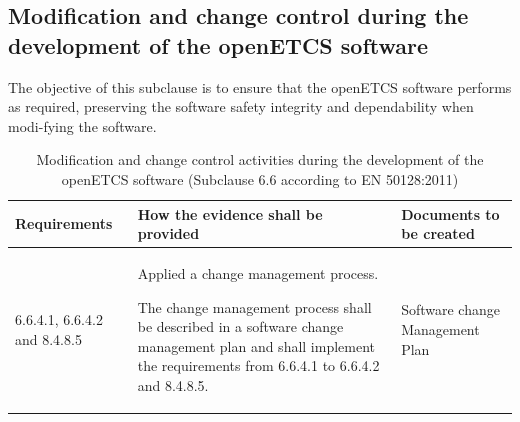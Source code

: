 \documentclass{template/openetcs_report}
\begin{document}
\subsection{Modification and change control during the development of the openETCS software}
\begin{flushleft}
The objective of this subclause is to ensure that the openETCS software performs as required, preserving the software safety integrity and dependability when modi-fying the software.
\end{flushleft}
{\footnotesize\sffamily\centering
\begin{longtable}{|p{2cm}|p{9cm}|p{3cm}|}
\caption{Modification and change control activities during the development of the openETCS software (Subclause 6.6 according to EN 50128:2011)}\\
\hline
\bfseries Requirements & \bfseries How the evidence shall be provided & \bfseries Documents to be created\\
\hline
\hline
\endhead
\hline
\endfoot

6.6.4.1, 6.6.4.2 and 8.4.8.5 & Applied a change management process.

The change management process shall be described in a  software change management plan and shall implement the requirements from 6.6.4.1 to 6.6.4.2 and 8.4.8.5.
& Software change Management Plan\\ 
\hline
\end{longtable}}
\end{document}

